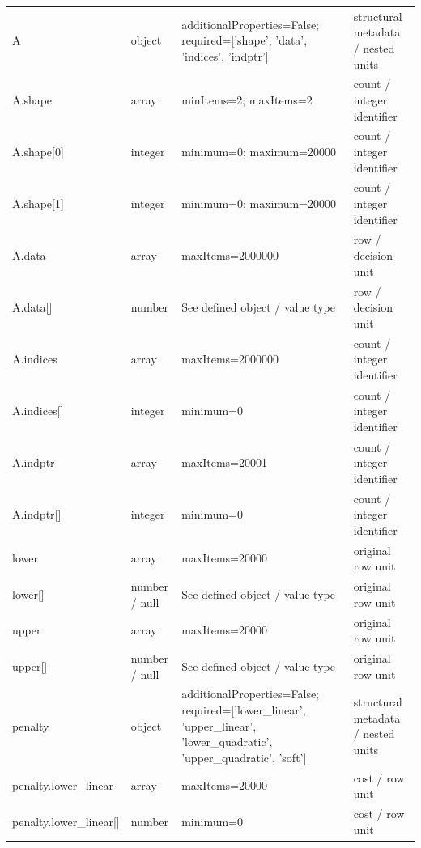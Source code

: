 \begin{longtable}{@{}>{\raggedright\arraybackslash}p{}>{\raggedright\arraybackslash}p{}>{\raggedright\arraybackslash}p{}>{\raggedright\arraybackslash}p{}@{}}
A & object & additionalProperties=\allowbreak{}False; required=\allowbreak{}['shape', 'data', 'indices', 'indptr'] & structural metadata /\allowbreak{} nested units\\
A.\allowbreak{}shape & array & minItems=\allowbreak{}2; maxItems=\allowbreak{}2 & count /\allowbreak{} integer identifier\\
A.\allowbreak{}shape[0] & integer & minimum=\allowbreak{}0; maximum=\allowbreak{}20000 & count /\allowbreak{} integer identifier\\
A.\allowbreak{}shape[1] & integer & minimum=\allowbreak{}0; maximum=\allowbreak{}20000 & count /\allowbreak{} integer identifier\\
A.\allowbreak{}data & array & maxItems=\allowbreak{}2000000 & row /\allowbreak{} decision unit\\
A.\allowbreak{}data[] & number & See defined object /\allowbreak{} value type & row /\allowbreak{} decision unit\\
A.\allowbreak{}indices & array & maxItems=\allowbreak{}2000000 & count /\allowbreak{} integer identifier\\
A.\allowbreak{}indices[] & integer & minimum=\allowbreak{}0 & count /\allowbreak{} integer identifier\\
A.\allowbreak{}indptr & array & maxItems=\allowbreak{}20001 & count /\allowbreak{} integer identifier\\
A.\allowbreak{}indptr[] & integer & minimum=\allowbreak{}0 & count /\allowbreak{} integer identifier\\
lower & array & maxItems=\allowbreak{}20000 & original row unit\\
lower[] & number /\allowbreak{} null & See defined object /\allowbreak{} value type & original row unit\\
upper & array & maxItems=\allowbreak{}20000 & original row unit\\
upper[] & number /\allowbreak{} null & See defined object /\allowbreak{} value type & original row unit\\
penalty & object & additionalProperties=\allowbreak{}False; required=\allowbreak{}['lower\_\allowbreak{}linear', 'upper\_\allowbreak{}linear', 'lower\_\allowbreak{}quadratic', 'upper\_\allowbreak{}quadratic', 'soft'] & structural metadata /\allowbreak{} nested units\\
penalty.\allowbreak{}lower\_\allowbreak{}linear & array & maxItems=\allowbreak{}20000 & cost /\allowbreak{} row unit\\
penalty.\allowbreak{}lower\_\allowbreak{}linear[] & number & minimum=\allowbreak{}0 & cost /\allowbreak{} row unit\\

\end{longtable}
